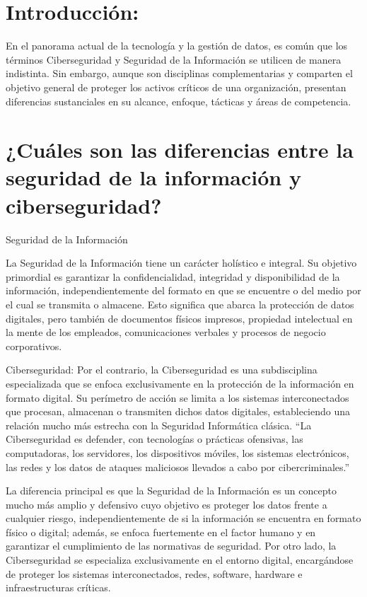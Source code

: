 \documentclass[letterpaper,11pt]{article}
\begin{document}
    


    \newpage
    {\hypersetup{linkcolor=black}\tableofcontents}
    \thispagestyle{empty}
    
    \newpage

    \setcounter{page}{1}
    \singlespacing

  \section{Introducción:}

  En el panorama actual de la tecnología y la gestión de datos, es común que los términos Ciberseguridad y Seguridad de la Información se utilicen de manera indistinta. Sin embargo, aunque son disciplinas complementarias y comparten el objetivo general de proteger los activos críticos de una organización, presentan diferencias sustanciales en su alcance, enfoque, tácticas y áreas de competencia.

  \section{¿Cuáles son las diferencias entre la seguridad de la información y ciberseguridad?}

  Seguridad de la Información

  La Seguridad de la Información tiene un carácter holístico e integral. Su objetivo primordial es garantizar la confidencialidad, integridad y disponibilidad de la información, independientemente del formato en que se encuentre o del medio por el cual se transmita o almacene. Esto significa que abarca la protección de datos digitales, pero también de documentos físicos impresos, propiedad intelectual en la mente de los empleados, comunicaciones verbales y procesos de negocio corporativos.

  Ciberseguridad: Por el contrario, la Ciberseguridad es una subdisciplina especializada que se enfoca exclusivamente en la protección de la información en formato digital. Su perímetro de acción se limita a los sistemas interconectados que procesan, almacenan o transmiten dichos datos digitales, estableciendo una relación mucho más estrecha con la Seguridad Informática clásica. ``La Ciberseguridad es defender, con tecnologías o prácticas ofensivas, las computadoras, los servidores, los dispositivos móviles, los sistemas electrónicos, las redes y los datos de ataques maliciosos llevados a cabo por cibercriminales.''

  La diferencia principal es que la Seguridad de la Información es un concepto mucho más amplio y defensivo cuyo objetivo es proteger los datos frente a cualquier riesgo, independientemente de si la información se encuentra en formato físico o digital; además, se enfoca fuertemente en el factor humano y en garantizar el cumplimiento de las normativas de seguridad. Por otro lado, la Ciberseguridad se especializa exclusivamente en el entorno digital, encargándose de proteger los sistemas interconectados, redes, software, hardware e infraestructuras críticas.
  
\end{document}
